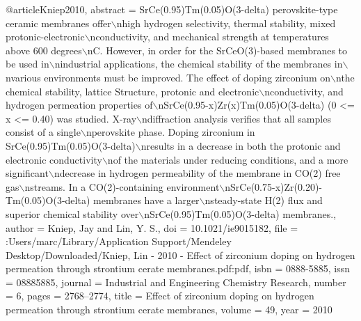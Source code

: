 @article{Kniep2010,
abstract = {SrCe(0.95)Tm(0.05)O(3-delta) perovskite-type ceramic membranes offer$\backslash$nhigh hydrogen selectivity, thermal stability, mixed protonic-electronic$\backslash$nconductivity, and mechanical strength at temperatures above 600 degrees$\backslash$nC. However, in order for the SrCeO(3)-based membranes to be used in$\backslash$nindustrial applications, the chemical stability of the membranes in$\backslash$nvarious environments must be improved. The effect of doping zirconium on$\backslash$nthe chemical stability, lattice Structure, protonic and electronic$\backslash$nconductivity, and hydrogen permeation properties of$\backslash$nSrCe(0.95-x)Zr(x)Tm(0.05)O(3-delta) (0 {\textless}= x {\textless}= 0.40) was studied. X-ray$\backslash$ndiffraction analysis verifies that all samples consist of a single$\backslash$nperovskite phase. Doping zirconium in SrCe(0.95)Tm(0.05)O(3-delta)$\backslash$nresults in a decrease in both the protonic and electronic conductivity$\backslash$nof the materials under reducing conditions, and a more significant$\backslash$ndecrease in hydrogen permeability of the membrane in CO(2) free gas$\backslash$nstreams. In a CO(2)-containing environment$\backslash$nSrCe(0.75-x)Zr(0.20)-Tm(0.05)O(3-delta) membranes have a larger$\backslash$nsteady-state H(2) flux and superior chemical stability over$\backslash$nSrCe(0.95)Tm(0.05)O(3-delta) membranes.},
author = {Kniep, Jay and Lin, Y. S.},
doi = {10.1021/ie9015182},
file = {:Users/marc/Library/Application Support/Mendeley Desktop/Downloaded/Kniep, Lin - 2010 - Effect of zirconium doping on hydrogen permeation through strontium cerate membranes.pdf:pdf},
isbn = {0888-5885},
issn = {08885885},
journal = {Industrial and Engineering Chemistry Research},
number = {6},
pages = {2768--2774},
title = {{Effect of zirconium doping on hydrogen permeation through strontium cerate membranes}},
volume = {49},
year = {2010}
}
